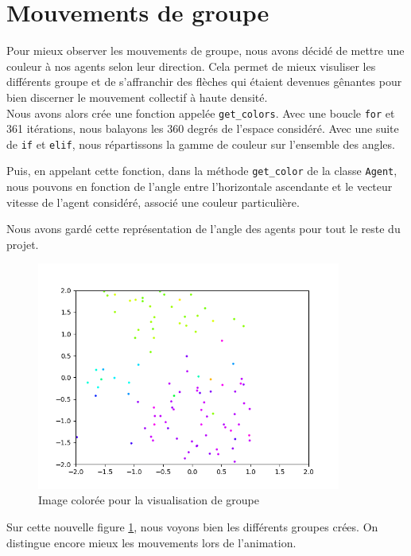 \documentclass[french, a4paper, 12pt, openany]{report}
\begin{document}
   
\section{Mouvements de groupe}

   Pour mieux observer les mouvements de groupe, nous avons décidé de mettre une couleur à nos agents selon leur direction. Cela permet de mieux visuliser les différents groupe et de s'affranchir des flèches qui étaient devenues gênantes pour bien discerner le mouvement collectif à haute densité.\\
   
   Nous avons alors crée une fonction appelée \verb|get_colors|. Avec une boucle \verb|for| et 361 itérations, nous balayons les 360 degrés de l'espace considéré. Avec une suite de \verb|if| et \verb|elif|, nous répartissons la gamme de couleur sur l'ensemble des angles.
   
   Puis, en appelant cette fonction, dans la méthode \verb|get_color| de la classe \verb|Agent|, nous pouvons en fonction de l'angle entre l'horizontale ascendante et le vecteur vitesse de l'agent considéré, associé une couleur particulière.
   
   
   
   Nous avons gardé cette représentation de l'angle des agents pour tout le reste du projet.
   \begin{figure}[!h]
		\centering
		\includegraphics[width=10cm]{images/image_6.png}
		\caption{Image colorée pour la visualisation de groupe}
		\label{couleurs_image}
	\end{figure}  
   
   Sur cette nouvelle figure \ref{couleurs_image}, nous voyons bien les différents groupes crées. On distingue encore mieux les mouvements lors de l'animation.\\
   
\end{document}
